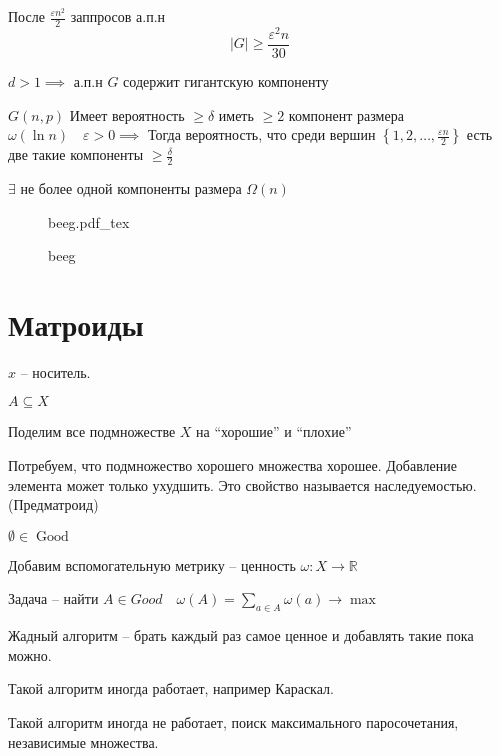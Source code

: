 \documentclass{book}
\newcommand\R{\ensuremath{\mathbb{R}}}
\renewcommand\O{\ensuremath{\emptyset}}
\theoremstyle{definition}
\newcommand{\incfig}[1]{%
    \def\svgwidth{\columnwidth}
    {#1.pdf_tex}
}
\DeclareMathOperator{\Good}{Good}
\begin{document}
    \begin{lemma}
        После $\frac{\varepsilon n^2}{2}$ заппросов а.п.н \[\left| G \right| \geqslant \frac{\varepsilon^2n}{30}\]
    \end{lemma}

    \begin{theorem}
        $d > 1 \implies $ а.п.н $G$ содержит гигантскую компоненту
    \end{theorem}

    \begin{lemma}
        $G(n,p)$ Имеет вероятность $\geqslant \delta$ иметь $\geqslant 2$ компонент размера $\omega\left( \ln n \right) \quad \varepsilon>0\implies $ Тогда вероятность, что среди вершин $\left\{ 1, 2, \ldots, \frac{\varepsilon n}{2} \right\} $ есть две такие компоненты $ \geqslant \frac{\delta}{2}$
    \end{lemma}

    \begin{corollary}
        $\exists $ не более одной компоненты размера $\Omega\left( n \right) $
    \end{corollary}

\begin{figure}[!ht]
    \centering
    \incfig{beeg}
    \caption{beeg}
    \label{fig:beeg}
\end{figure}


\section{Матроиды}

\begin{definition}
    $x$ -- носитель.

     $A\subseteq X$

     Поделим все подмножестве $X$ на ``хорошие'' и  ``плохие''

     Потребуем, что подмножество хорошего множества хорошее. Добавление элемента может только ухудшить. Это свойство называется наследуемостью. (Предматроид)

      $\O \in \Good$

      Добавим вспомогательную метрику -- ценность $\omega: X\to \R$

      Задача -- найти $A\in Good\quad \omega(A) = \sum_{a\in A} \omega(a) \to \max$ 

      Жадный алгоритм -- брать каждый раз самое ценное и добавлять такие пока можно.

      Такой алгоритм иногда работает, например Караскал.

      Такой алгоритм иногда не работает, поиск максимального паросочетания, независимые множества.


\end{definition}
\end{document}
